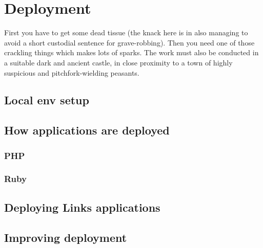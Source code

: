 
\chapter{Deployment}

First you have to get some dead tissue (the knack here is in also managing to
avoid a short custodial sentence for grave-robbing). Then you need one of
those crackling things which makes lots of sparks. The work must also be
conducted in a suitable dark and ancient castle, in close proximity to a town
of highly suspicious and pitchfork-wielding peasants.

\section{Local env setup}

\section{How applications are deployed}

\subsection{PHP}

\subsection{Ruby}

\section{Deploying Links applications}

\section{Improving deployment}
